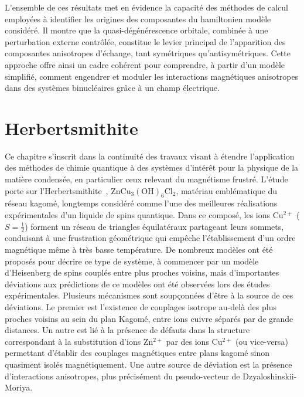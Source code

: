 \documentclass[12pt,a4paper]{report}
\numberwithin{equation}{section}
\begin{document}
L’ensemble de ces résultats met en évidence la capacité des méthodes de calcul employées à identifier les origines des composantes du hamiltonien modèle considéré.
Il montre que la quasi-dégénérescence orbitale, combinée à une perturbation externe contrôlée, constitue le levier principal de l’apparition des composantes anisotropes d'échange, tant symétriques qu’antisymétriques. 
Cette approche offre ainsi un cadre cohérent pour comprendre, à partir d’un modèle simplifié, comment engendrer et moduler les interactions magnétiques anisotropes dans des systèmes binucléaires grâce à un champ électrique.

\section*{Herbertsmithite}

Ce chapitre s’inscrit dans la continuité des travaux visant à étendre l’application des méthodes de chimie quantique à des systèmes d’intérêt pour la physique de la matière condensée, en particulier ceux relevant du magnétisme frustré. 
L’étude porte sur l’Herbertsmithite~\cite{braithwaite_herbertsmithite_2004}, \(\mathrm{ZnCu_3(OH)_6Cl_2}\), matériau emblématique du réseau kagomé, longtemps considéré comme l’une des meilleures réalisations expérimentales d’un liquide de spins quantique. 
Dans ce composé, les ions Cu\(^{2+}\) (\(S = \tfrac{1}{2}\)) forment un réseau de triangles équilatéraux partageant leurs sommets, conduisant à une frustration géométrique qui empêche l’établissement d’un ordre magnétique même à très basse température.  
De nombreux modèles ont été proposés pour décrire ce type de système, à commencer par un modèle d'Heisenberg de spins couplés entre plus proches voisins, mais d'importantes déviations aux prédictions de ce modèles ont été observées lors des études expérimentales.
Plusieurs mécanismes sont soupçonnées d'être à la source de ces déviations.
Le premier est l'existence de couplages isotrope au-delà des plus proches voisins au sein du plan Kagomé, entre ions cuivre séparés par de grande distances. Un autre est lié à la présence de défauts dans la structure correspondant à la substitution d'ions Zn$^{2+}$ par des ions Cu$^{2+}$ (ou vice-versa) permettant d'établir des couplages magnétiques entre plans kagomé sinon quasiment isolés magnétiquement. Une autre source de déviation est la présence d'interactions anisotropes, plus précisément du pseudo-vecteur de Dzyaloshinskii-Moriya.
\end{document}
